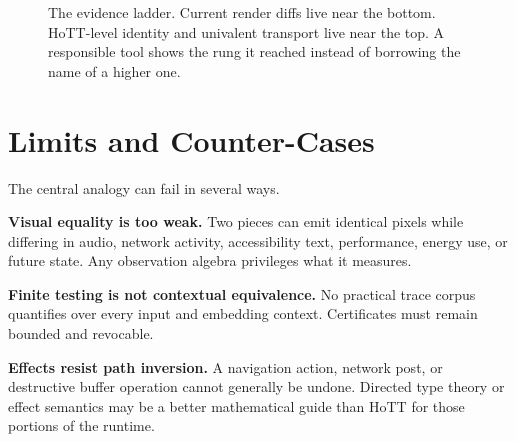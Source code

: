 \documentclass[10pt,letterpaper,twocolumn]{article}
\begin{document}
\begin{figure}[t]
\centering
{}
\caption{The evidence ladder. Current render diffs live near the bottom. HoTT-level identity and univalent transport live near the top. A responsible tool shows the rung it reached instead of borrowing the name of a higher one.}
\label{fig:evidence-ladder}
\end{figure}

\section{Limits and Counter-Cases}
\label{sec:limits}

The central analogy can fail in several ways.

\textbf{Visual equality is too weak.} Two pieces can emit identical pixels while differing in audio, network activity, accessibility text, performance, energy use, or future state. Any observation algebra privileges what it measures.

\textbf{Finite testing is not contextual equivalence.} No practical trace corpus quantifies over every input and embedding context. Certificates must remain bounded and revocable.

\textbf{Effects resist path inversion.} A navigation action, network post, or destructive buffer operation cannot generally be undone. Directed type theory or effect semantics may be a better mathematical guide than HoTT for those portions of the runtime.
\end{document}
